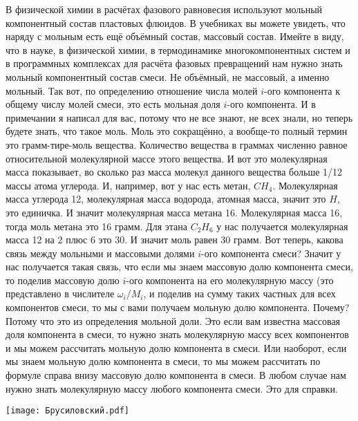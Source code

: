 \documentclass[main.tex]{subfiles}
\begin{document}
В физической химии в расчётах фазового равновесия используют мольный компонентный состав пластовых флюидов.
В учебниках вы можете увидеть, что наряду с мольным есть ещё объёмный состав, массовый состав.
Имейте в виду, что в науке, в физической химии, в термодинамике многокомпонентных систем и в программных комплексах для расчёта фазовых превращений нам нужно знать мольный компонентный состав смеси.
Не объёмный, не массовый, а именно мольный.
Так вот, по определению отношение числа молей $i$-ого компонента к общему числу молей смеси, это есть мольная доля $i$-ого компонента.
И в примечании я написал для вас, потому что не все знают, не всех знали, но теперь будете знать, что такое моль.
Моль это сокращённо, а вообще-то полный термин это грамм-тире-моль вещества.
Количество вещества в граммах численно равное относительной молекулярной массе этого вещества.
И вот это молекулярная масса показывает, во сколько раз масса молекул данного вещества больше 1/12 массы атома углерода.
И, например, вот у нас есть метан, $CH_4$.
Молекулярная масса углерода 12, молекулярная масса водорода, атомная масса, значит это $H$, это единичка.
И значит молекулярная масса метана 16.
Молекулярная масса 16, тогда моль метана это 16 грамм.
Для этана $C_2H_6$ у нас получается молекулярная масса 12 на 2 плюс 6 это 30.
И значит моль равен 30 грамм.
Вот теперь, какова связь между мольными и массовыми долями $i$-ого компонента смеси?
Значит у нас получается такая связь, что если мы знаем массовую долю компонента смеси, то поделив массовую долю $i$-ого компонента на его молекулярную массу (это представлено в числителе $\omega_i/M_i$, и поделив на сумму таких частных для всех компонентов смеси, то мы с вами получаем мольную долю компонента.
Почему?
Потому что это из определения мольной доли.
Это если вам известна массовая доля компонента в смеси, то нужно знать молекулярную массу всех компонентов и мы можем рассчитать мольную долю компонента в смеси.
Или наоборот, если мы знаем мольную долю компонента в смеси, то мы можем рассчитать по формуле справа внизу массовую долю компонента в смеси.
В любом случае нам нужно знать молекулярную массу любого компонента смеси.
Это для справки.

\begin{center}
\texttt{[image: Брусиловский.pdf]}
\end{center}
\end{document}

